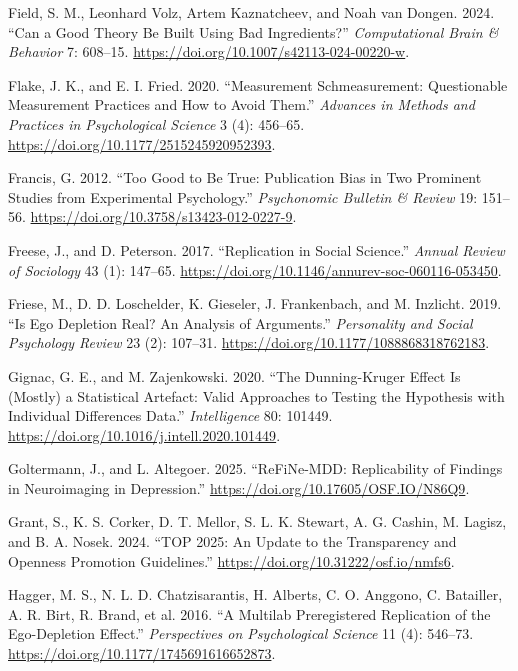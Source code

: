\documentclass[
  letterpaper,
  DIV=11,
  openany,
  fontsize=12pt,
  parskip=half,
  headings=big,
  numbers=noenddot,
  titlepage=false]{scrreprt}
\newlength{\cslhangindent}
\newenvironment{CSLReferences}[2] %
 {\begin{list}{}{%
  \setlength{\itemindent}{0pt}
  \setlength{\leftmargin}{0pt}
  \setlength{\parsep}{0pt}
  \ifodd #1
   \setlength{\leftmargin}{\cslhangindent}
   \setlength{\itemindent}{-1\cslhangindent}
  \fi
  \setlength{\itemsep}{#2\baselineskip}}}
 {\end{list}}
\begin{document}
\begin{CSLReferences}{1}{0}
Field, S. M., Leonhard Volz, Artem Kaznatcheev, and Noah van Dongen.
2024. {``Can a Good Theory Be Built Using Bad Ingredients?''}
\emph{Computational Brain \& Behavior} 7: 608--15.
\url{https://doi.org/10.1007/s42113-024-00220-w}.

Flake, J. K., and E. I. Fried. 2020. {``Measurement Schmeasurement:
Questionable Measurement Practices and How to Avoid Them.''}
\emph{Advances in Methods and Practices in Psychological Science} 3 (4):
456--65. \url{https://doi.org/10.1177/2515245920952393}.

Francis, G. 2012. {``Too Good to Be True: Publication Bias in Two
Prominent Studies from Experimental Psychology.''} \emph{Psychonomic
Bulletin \& Review} 19: 151--56.
\url{https://doi.org/10.3758/s13423-012-0227-9}.

Freese, J., and D. Peterson. 2017. {``Replication in Social Science.''}
\emph{Annual Review of Sociology} 43 (1): 147--65.
\url{https://doi.org/10.1146/annurev-soc-060116-053450}.

Friese, M., D. D. Loschelder, K. Gieseler, J. Frankenbach, and M.
Inzlicht. 2019. {``Is Ego Depletion Real? An Analysis of Arguments.''}
\emph{Personality and Social Psychology Review} 23 (2): 107--31.
\url{https://doi.org/10.1177/1088868318762183}.

Gignac, G. E., and M. Zajenkowski. 2020. {``The Dunning-Kruger Effect Is
(Mostly) a Statistical Artefact: Valid Approaches to Testing the
Hypothesis with Individual Differences Data.''} \emph{Intelligence} 80:
101449. \url{https://doi.org/10.1016/j.intell.2020.101449}.

Goltermann, J., and L. Altegoer. 2025. {``ReFiNe-MDD: Replicability of
Findings in Neuroimaging in Depression.''}
\url{https://doi.org/10.17605/OSF.IO/N86Q9}.

Grant, S., K. S. Corker, D. T. Mellor, S. L. K. Stewart, A. G. Cashin,
M. Lagisz, and B. A. Nosek. 2024. {``TOP 2025: An Update to the
Transparency and Openness Promotion Guidelines.''}
\url{https://doi.org/10.31222/osf.io/nmfs6}.

Hagger, M. S., N. L. D. Chatzisarantis, H. Alberts, C. O. Anggono, C.
Batailler, A. R. Birt, R. Brand, et al. 2016. {``A Multilab
Preregistered Replication of the Ego-Depletion Effect.''}
\emph{Perspectives on Psychological Science} 11 (4): 546--73.
\url{https://doi.org/10.1177/1745691616652873}.


\end{CSLReferences}
\end{document}
